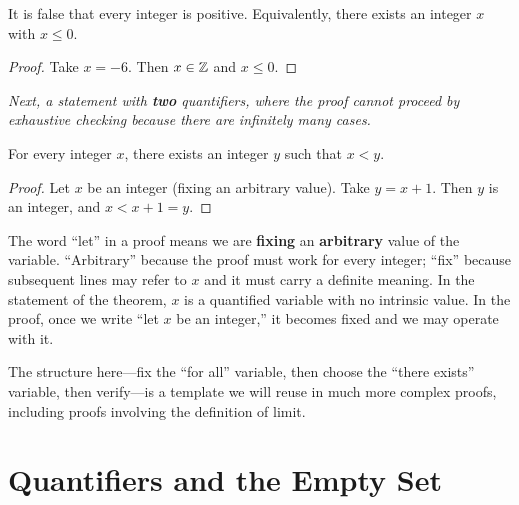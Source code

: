 \begin{theorem}
\label{thm:1-3}
It is false that every integer is positive.  Equivalently, there exists an integer $x$ with $x \le 0$.
\end{theorem}

\begin{proof}
Take $x = -6$.  Then $x \in \mathbb{Z}$ and $x \le 0$.
\end{proof}

\textit{Next, a statement with \textbf{two} quantifiers, where the proof cannot proceed by exhaustive checking because there are infinitely many cases.}

\begin{theorem}
\label{thm:1-4}
For every integer $x$, there exists an integer $y$ such that $x < y$.
\end{theorem}

\begin{proof}
Let $x$ be an integer (fixing an arbitrary value).  Take $y = x + 1$.  Then $y$ is an integer, and $x < x + 1 = y$.
\end{proof}

\begin{remark}
The word ``let'' in a proof means we are \textbf{fixing} an \textbf{arbitrary} value of the variable.  ``Arbitrary'' because the proof must work for every integer; ``fix'' because subsequent lines may refer to $x$ and it must carry a definite meaning.  In the statement of the theorem, $x$ is a quantified variable with no intrinsic value.  In the proof, once we write ``let $x$ be an integer,'' it becomes fixed and we may operate with it.
\end{remark}

\begin{remark}
The structure here---fix the ``for all'' variable, then choose the ``there exists'' variable, then verify---is a template we will reuse in much more complex proofs, including proofs involving the definition of limit.
\end{remark}

\section{Quantifiers and the Empty Set}
\label{sec:1.6}

